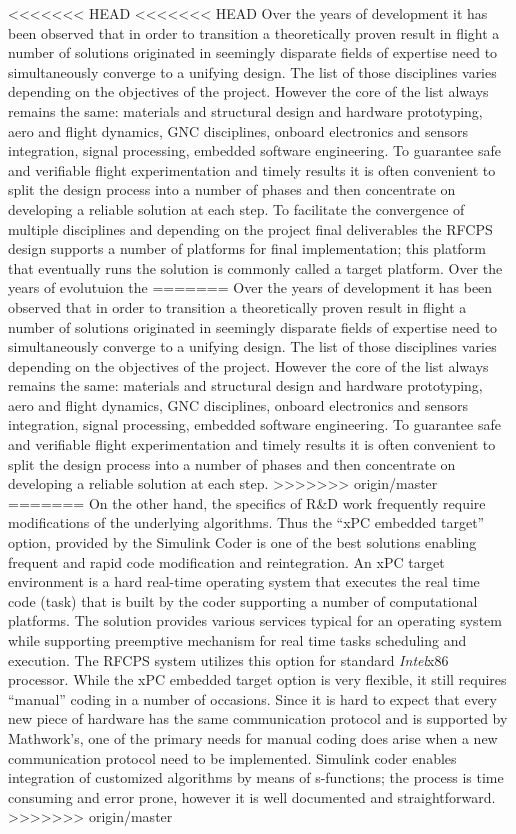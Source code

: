 \documentclass[letterpaper, 10 pt, conference]{ieeeconf}  %
\begin{document}
<<<<<<< HEAD
<<<<<<< HEAD
Over the years of development it has been observed that in order to transition a theoretically proven result in flight a number of solutions originated in seemingly disparate fields of expertise need to simultaneously converge to a unifying design. The list of those disciplines varies depending on the objectives of the project. However the core of the list always remains the same: materials and structural design and hardware prototyping, aero and flight dynamics, GNC disciplines, onboard electronics and sensors integration, signal processing, embedded software engineering. To guarantee safe and verifiable flight experimentation and timely results it is often convenient to split the design process into a number of phases and then concentrate on developing a reliable solution at each step. To facilitate the convergence of multiple disciplines and depending on the project final deliverables the RFCPS design supports a number of platforms for final implementation; this platform that eventually runs the solution is commonly called a target platform. 
Over the years of evolutuion the
=======
Over the years of development it has been observed that in order to transition a theoretically proven result in flight a number of solutions originated in seemingly disparate fields of expertise need to simultaneously converge to a unifying design. The list of those disciplines varies depending on the objectives of the project. However the core of the list always remains the same: materials and structural design and hardware prototyping, aero and flight dynamics, GNC disciplines, onboard electronics and sensors integration, signal processing, embedded software engineering. To guarantee safe and verifiable flight experimentation and timely results it is often convenient to split the design process into a number of phases and then concentrate on developing a reliable solution at each step. 
>>>>>>> origin/master
=======
On the other hand, the specifics of R\&D work frequently require modifications of the underlying algorithms. Thus the ``xPC embedded target'' option, provided by the Simulink Coder is one of the best solutions  enabling frequent and rapid code modification and reintegration. An xPC target environment is a hard real-time operating system that executes the real time code (task) that is built by the coder supporting a number of computational platforms. The solution provides various services typical for an operating system while supporting preemptive mechanism  for real time tasks scheduling and execution. The RFCPS system utilizes this option for standard \emph{Intel}x$86$ processor. While the xPC embedded target option is very flexible, it still requires ``manual'' coding in a number of occasions. Since it is hard to expect that every new piece of hardware has the same communication protocol and is supported by Mathwork's, one of the primary needs for manual coding does arise when a new communication protocol need to be implemented. Simulink coder enables integration of customized algorithms by means of s-functions; the process is time consuming and error prone, however it is well documented and straightforward. 
>>>>>>> origin/master
\end{document}
